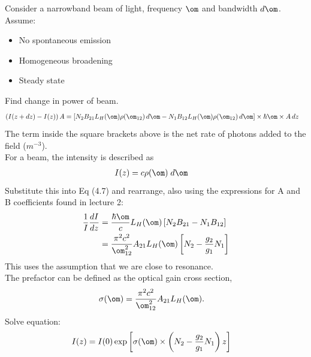 \documentclass[a4paper, 11pt, normalem]{report}
\begin{document}
\begin{figure}[H]
    \centering
\end{figure}
Consider a  narrowband beam of light, frequency $\om$ and bandwidth $d\om$. \\
Assume:
\begin{itemize}
    \item No spontaneous emission
    \item Homogeneous broadening
    \item Steady state
\end{itemize}
Find change in power of beam.
\begin{align}
    \left(I(z+dz) - I(z)\right)A &= \left[N_2B_{21}L_H(\om)\rho(\om_{12})\,d\om - N_1B_{12}L_H(\om)\rho(\om_{12})\,d\om\right]\times\hbar\om\times A\,dz
\end{align}
The term inside the square brackets above is the net rate of photons added to the field ($m^{-3}$).\\
For a beam, the intensity is described as
\begin{align}
    I(z) &= c\rho(\om)\;d\om
\end{align}
Substitute this into Eq (4.7) and rearrange, also using the expressions for A and B coefficients found in lecture 2:
\begin{align}
    \frac{1}{I}\frac{dI}{dz} &= \frac{\hbar\om}{c}L_H(\om)\left[N_2B_{21} - N_1B_{12}\right] \\
                             &= \frac{\pi^2c^2}{\om^2_{12}}A_{21}L_H(\om)\left[N_2 - \frac{g_2}{g_1}N_1\right]
\end{align}
This uses the assumption that we are close to resonance.\\
The prefactor can be defined as the optical gain cross section,
\begin{align}
    \sigma(\om) &= \frac{\pi^2c^2}{\om_{12}^2}A_{21}L_H(\om).
\end{align}
Solve equation:
\begin{align}
    I(z) &= I(0)\exp\left[\sigma(\om)\times\left(N_2-\frac{g_2}{g_1}N_1\right)z\right]
\end{align}
\end{document}
